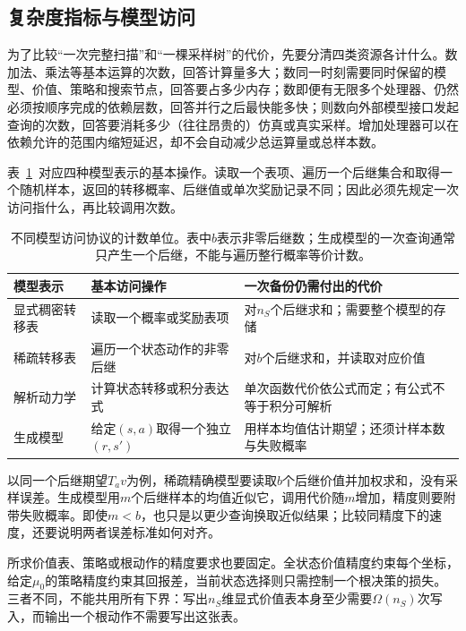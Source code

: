 \subsection{复杂度指标与模型访问}
\label{sec:rl-planning-access-complexity}

为了比较“一次完整扫描”和“一棵采样树”的代价，先要分清四类资源各计什么。数加法、乘法等基本运算的次数，回答计算量多大；数同一时刻需要同时保留的模型、价值、策略和搜索节点，回答要占多少内存；数即便有无限多个处理器、仍然必须按顺序完成的依赖层数，回答并行之后最快能多快；则数向外部模型接口发起查询的次数，回答要消耗多少（往往昂贵的）仿真或真实采样。增加处理器可以在依赖允许的范围内缩短延迟，却不会自动减少总运算量或总样本数。

表~\ref{tab:rl-planning-access-models}~对应四种模型表示的基本操作。读取一个表项、遍历一个后继集合和取得一个随机样本，返回的转移概率、后继值或单次奖励记录不同；因此必须先规定一次访问指什么，再比较调用次数。

\begin{table}[htbp]
 \centering
 \small
 \begin{tabularx}{\linewidth}{@{}l>{\raggedright\arraybackslash}X>{\raggedright\arraybackslash}X@{}}
  \toprule
  模型表示 & 基本访问操作 & 一次备份仍需付出的代价\\
  \midrule
  显式稠密转移表 & 读取一个概率或奖励表项 & 对$n_S$个后继求和；需要整个模型的存储\\
  稀疏转移表 & 遍历一个状态动作的非零后继 & 对$b$个后继求和，并读取对应价值\\
  解析动力学 & 计算状态转移或积分表达式 & 单次函数代价依公式而定；有公式不等于积分可解析\\
  生成模型 & 给定$(s,a)$取得一个独立$(r,s')$ & 用样本均值估计期望；还须计样本数与失败概率\\
  \bottomrule
 \end{tabularx}
 \caption{不同模型访问协议的计数单位。表中$b$表示非零后继数；生成模型的一次查询通常只产生一个后继，不能与遍历整行概率等价计数。}
 \label{tab:rl-planning-access-models}
\end{table}

以同一个后继期望$T_av$为例，稀疏精确模型要读取$b$个后继价值并加权求和，没有采样误差。生成模型用$m$个后继样本的均值近似它，调用代价随$m$增加，精度则要附带失败概率。即使$m<b$，也只是以更少查询换取近似结果；比较同精度下的速度，还要说明两者误差标准如何对齐。

所求价值表、策略或根动作的精度要求也要固定。全状态价值精度约束每个坐标，给定$\mu_0$的策略精度约束其回报差，当前状态选择则只需控制一个根决策的损失。三者不同，不能共用所有下界：写出$n_S$维显式价值表本身至少需要$\Omega(n_S)$次写入，而输出一个根动作不需要写出这张表。


